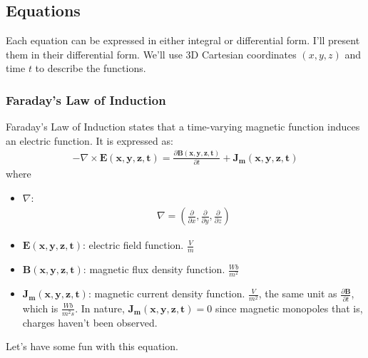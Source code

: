 \subsection{Equations}

Each equation can be expressed in either integral or differential form.
I'll present them in their differential form. We'll use 3D Cartesian
coordinates \((x,y,z)\) and time \(t\) to describe the functions.

\subsubsection{Faraday's Law of Induction}
Faraday's Law of Induction states that a time-varying magnetic function
induces an electric function. It is expressed as:
\begin{align*}
  -\nabla \times \mathbf{E(x,y,z,t)} = \frac{\partial \mathbf{B(x,y,z,t)}}{\partial t} + \mathbf{J_m(x,y,z,t)} \tag{1}
\end{align*}
where
\begin{itemize}
  \item \( \nabla \):
    \begin{align*}
      \nabla = \left( \frac{\partial}{\partial x}, \frac{\partial}{\partial y}, \frac{\partial}{\partial z} \right)
    \end{align*}
  \item \( \mathbf{E(x,y,z,t)} \): electric field function. \( \frac{V}{m} \)
  \item \( \mathbf{B(x,y,z,t)} \): magnetic flux density function.
    \( \frac{Wb}{m^2} \)
  \item \( \mathbf{J_m(x,y,z,t)} \): magnetic current density function.
    \( \frac{V}{m^2} \), the same unit as \(\frac{\partial \mathbf{B}}{\partial t}\), which is
    \(\frac{Wb}{m^2 s}\). In nature, \( \mathbf{J_m(x,y,z,t)} = 0 \) since
    magnetic monopoles that is, charges haven't been observed.
\end{itemize}
Let's have some fun with this equation.
